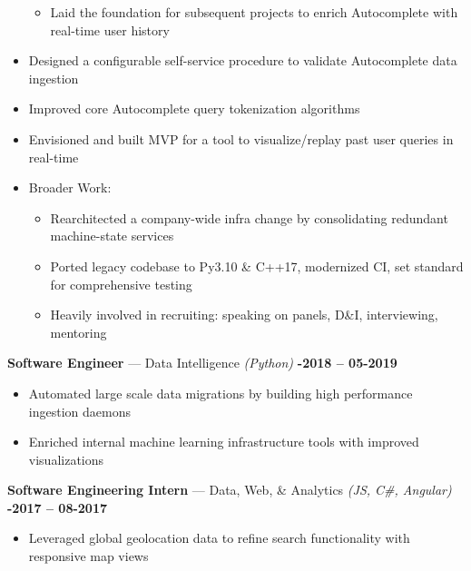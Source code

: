 \documentclass[margin,10.5pt]{res}
\begin{document}
\begin{resume}
\begin{itemize}
\begin{itemize}
            \item Laid the foundation for subsequent projects to enrich Autocomplete with real-time user history
        \end{itemize}
        \item Designed a configurable self-service procedure to validate Autocomplete data ingestion
        \item Improved core Autocomplete query tokenization algorithms
        \item Envisioned and built MVP for a tool to visualize/replay past user queries in real-time
        \item Broader Work:
        \begin{itemize}
            \setlength\itemsep{0.3em}
            \item Rearchitected a company-wide infra change by consolidating redundant machine-state services
            \item Ported legacy codebase to Py3.10 \& C++17, modernized CI, set standard for comprehensive testing
            \item Heavily involved in recruiting: speaking on panels, D\&I, interviewing, mentoring
        \end{itemize}
    \end{itemize}
    \textbf{Software Engineer} --- Data Intelligence
    \textit{(Python)}\hfill
    \textsc{\bfseries{}-2018 -- 05-2019}
    \vspace{0.5em}
    \begin{itemize}
        \item Automated large scale data migrations by building high performance ingestion daemons
        \item Enriched internal machine learning infrastructure tools with improved visualizations
    \end{itemize}
    \textbf{Software Engineering Intern} --- Data, Web, \& Analytics
    \textit{(JS, C\#, Angular)}\hfill
    \textsc{\bfseries{}-2017 -- 08-2017}
    \vspace{0.5em}
    \begin{itemize}
        \item Leveraged global geolocation data to refine search functionality with responsive map views
    \end{itemize}

    \vspace{8pt}
    

\end{resume}
\end{document}
